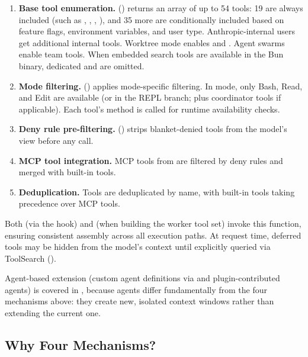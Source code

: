 \begin{enumerate}[nosep]
  \item \textbf{Base tool enumeration.}  () returns an array of up to 54 tools: 19 are always included (such as , , , ), and 35 more are conditionally included based on feature flags, environment variables, and user type. Anthropic-internal users get additional internal tools. Worktree mode enables  and . Agent swarms enable team tools. When embedded search tools are available in the Bun binary, dedicated  and  are omitted.
  \item \textbf{Mode filtering.}  () applies mode-specific filtering. In  mode, only Bash, Read, and Edit are available (or  in the REPL branch; plus coordinator tools if applicable). Each tool's  method is called for runtime availability checks.
  \item \textbf{Deny rule pre-filtering.}  () strips blanket-denied tools from the model's view before any call.
  \item \textbf{MCP tool integration.} MCP tools from  are filtered by deny rules and merged with built-in tools.
  \item \textbf{Deduplication.} Tools are deduplicated by name, with built-in tools taking precedence over MCP tools.
\end{enumerate}

Both  (via the  hook) and  (when building the worker tool set) invoke this function, ensuring consistent assembly across all execution paths. At request time, deferred tools may be hidden from the model's context until explicitly queried via ToolSearch ().

Agent-based extension (custom agent definitions via  and plugin-contributed agents) is covered in , because agents differ fundamentally from the four mechanisms above: they create new, isolated context windows rather than extending the current one.

\subsection{Why Four Mechanisms?}
\label{sec:ext:why-four}

